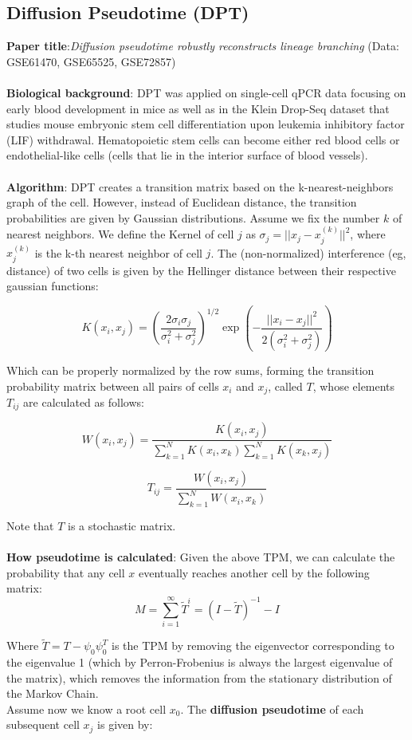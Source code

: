 \documentclass[11pt]{article}
\begin{document}
\subsection{Diffusion Pseudotime (DPT)}
\textbf{Paper title}:\emph{Diffusion pseudotime robustly reconstructs lineage branching} (Data:  GSE61470, GSE65525, GSE72857) \\
\\
\textbf{Biological background}: DPT was applied on single-cell qPCR data focusing on early blood development in mice as well as in the Klein Drop-Seq dataset that studies mouse embryonic stem cell differentiation upon leukemia inhibitory factor (LIF) withdrawal. Hematopoietic stem cells can become either red blood cells or endothelial-like cells (cells that lie in the interior surface of blood vessels). \\
\\
\textbf{Algorithm}: DPT creates a transition matrix based on the k-nearest-neighbors graph of the cell. However, instead of Euclidean distance, the transition probabilities are given by Gaussian distributions. Assume we fix the number $k$ of nearest neighbors. We define the Kernel of cell $j$ as $\sigma_j = ||x_j - x_{j}^{(k)}||^2$, where $x_{j}^{(k)}$ is the k-th nearest neighbor of cell $j$. The (non-normalized) interference (eg, distance) of two cells is given by the Hellinger distance between their respective gaussian functions:

$$
K(x_i, x_j) = \left( \frac{2\sigma_i \sigma_j}{\sigma_{i}^2 + \sigma_{j}^2}\right)^{1/2} \exp \left( -\frac{||x_i - x_j||^2}{2(\sigma_{i}^{2}+\sigma_{j}^{2})}\right)
$$

Which can be properly normalized by the row sums, forming the transition probability matrix between all pairs of cells $x_i$ and $x_j$, called $T$, whose elements $T_{ij}$ are calculated as follows:

$$
W(x_i, x_j) = \frac{K(x_i,x_j)}{\sum_{k=1}^{N}K(x_i,x_k) \sum_{k=1}^{N} K(x_k, x_j)}
$$

$$
T_{ij} = \frac{W(x_i, x_j)}{\sum_{k=1}^{N} W(x_i, x_k)}
$$

Note that $T$ is a stochastic matrix. \\
\\
\textbf{How pseudotime is calculated}: Given the above TPM, we can calculate the probability that any cell $x$ eventually reaches another cell by the following matrix:
$$
M = \sum_{i=1}^{\infty} \tilde{T}^i = (I - \tilde{T})^{-1} - I
$$ 

Where $\tilde{T} = T - \psi_0 \psi_{0}^{T}$ is the TPM by removing the eigenvector corresponding to the eigenvalue 1 (which by Perron-Frobenius is always the largest eigenvalue of the matrix), which removes the information from the stationary distribution of the Markov Chain. \\
Assume now we know a root cell $x_0$. The \textbf{diffusion pseudotime} of each subsequent cell $x_j$ is given by:
\end{document}
